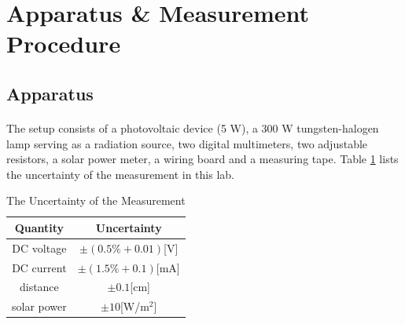 \documentclass[a4paper]{article}
\begin{document}
    \section{Apparatus \& Measurement Procedure}
    \subsection{Apparatus}
    \paragraph{}The setup consists of a photovoltaic device (5 W), a 300 W tungsten-halogen lamp serving as a radiation source, two digital multimeters, two adjustable resistors, a solar power meter, a wiring board and a measuring tape. Table \ref{tab:measurement uncertainty} lists the uncertainty of the measurement in this lab. 
    \begin{table}[!ht]
        \centering
        \begin{tabular}{|c|c|}
            \hline
            Quantity&Uncertainty\\\hline
            DC voltage&$\pm(0.5\%+0.01)$[V]\\\hline
            DC current&$\pm(1.5\%+0.1)$[mA]\\\hline
            distance&$\pm 0.1$[cm]\\\hline
            solar power&$\pm 10$[W/m$^2$]\\\hline
        \end{tabular}
        \caption{The Uncertainty of the Measurement}
        \label{tab:measurement uncertainty}
    \end{table}
\end{document}
